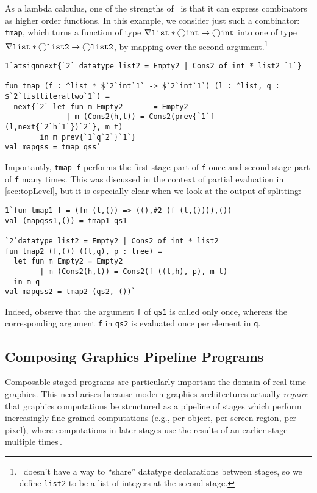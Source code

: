 As a lambda calculus, one of the strengths of \lang\ is that it
can express combinators as higher order functions.
In this example, we consider just such a combinator: \texttt{tmap},
which turns a function of type
$\nabla \mathtt{list} * \bigcirc \mathtt{int} \to \bigcirc \mathtt{int}$
into one of type
$\nabla \mathtt{list} * \bigcirc \mathtt{list2} \to \bigcirc \mathtt{list2}$,
by mapping over the second argument.\footnote{
\lang\ doesn't have a way to ``share'' datatype declarations between stages, 
so we define \texttt{list2} to be a list of integers at the second stage.}
\begin{lstlisting} 
1`atsignnext{`2` datatype list2 = Empty2 | Cons2 of int * list2 `1`}

fun tmap (f : ^list * $`2`int`1` -> $`2`int`1`) (l : ^list, q : $`2`listliteraltwo`1`) = 
  next{`2` let fun m Empty2       = Empty2
              | m (Cons2(h,t)) = Cons2(prev{`1`f (l,next{`2`h`1`})`2`}, m t)
        in m prev{`1`q`2`}`1`}
val mapqss = tmap qss`
\end{lstlisting}
Importantly, \texttt{tmap f} performs the first-stage part of \texttt{f} once
and second-stage part of \texttt{f} many times.
This was discussed in the context of partial evaluation in \ref{sec:topLevel}, 
but it is especially clear when we look at the output of splitting:
\begin{lstlisting} 
1`fun tmap1 f = (fn (l,()) => ((),#2 (f (l,()))),())
val (mapqss1,()) = tmap1 qs1

`2`datatype list2 = Empty2 | Cons2 of int * list2
fun tmap2 (f,()) ((l,q), p : tree) =
  let fun m Empty2 = Empty2
        | m (Cons2(h,t)) = Cons2(f ((l,h), p), m t) 
  in m q
val mapqss2 = tmap2 (qs2, ())`
\end{lstlisting}
%
Indeed, observe that the argument \texttt{f} of \texttt{qs1} is called only once,
whereas the corresponding argument \texttt{f} in \texttt{qs2} is evaluated once per element in \texttt{q}.

\subsection{Composing Graphics Pipeline Programs}
\label{sec:graphics}

Composable staged programs are particularly important the domain of real-time graphics.
This need arises because modern graphics architectures actually
\emph{require} that graphics computations be structured as a pipeline
of stages which perform increasingly fine-grained computations (e.g.,
per-object, per-screen region, per-pixel), where computations in later
stages use the results of an earlier
stage multiple times\,\cite{OpenGL4Spec}.

